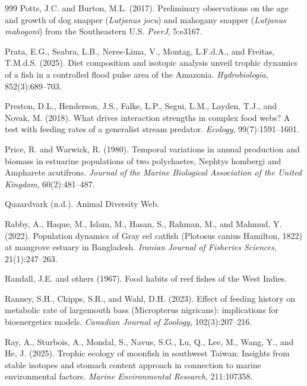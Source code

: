 \begin{thebibliography}{999}
Potts, J.C. and Burton, M.L. (2017). Preliminary observations on the age and growth of dog snapper (\textit{Lutjanus jocu}) and mahogany snapper (\textit{Lutjanus mahogoni}) from the Southeastern U.S. \textit{PeerJ}, 5:e3167.

Prata, E.G., Seabra, L.B., Neres-Lima, V., Montag, L.F.d.A., and Freitas, T.M.d.S. (2025). Diet composition and isotopic analysis unveil trophic dynamics of a fish in a controlled flood pulse area of the Amazonia. \textit{Hydrobiologia}, 852(3):689--703.

Preston, D.L., Henderson, J.S., Falke, L.P., Segui, L.M., Layden, T.J., and Novak, M. (2018). What drives interaction strengths in complex food webs? A test with feeding rates of a generalist stream predator. \textit{Ecology}, 99(7):1591--1601.

Price, R. and Warwick, R. (1980). Temporal variations in annual production and biomass in estuarine populations of two polychaetes, Nephtys hombergi and Ampharete acutifrons. \textit{Journal of the Marine Biological Association of the United Kingdom}, 60(2):481--487.

Quaardvark (n.d.). Animal Diversity Web.

Rabby, A., Haque, M., Islam, M., Hasan, S., Rahman, M., and Mahmud, Y. (2022). Population dynamics of Gray eel catfish (Plotosus canius Hamilton, 1822) at mangrove estuary in Bangladesh. \textit{Iranian Journal of Fisheries Sciences}, 21(1):247--263.

Randall, J.E. and others (1967). Food habits of reef fishes of the West Indies.

Ranney, S.H., Chipps, S.R., and Wahl, D.H. (2023). Effect of feeding history on metabolic rate of largemouth bass (Micropterus nigricans): implications for bioenergetics models. \textit{Canadian Journal of Zoology}, 102(3):207--216.

Ray, A., Sturbois, A., Mondal, S., Navus, S.G., Lu, Q., Lee, M., Wang, Y., and He, J. (2025). Trophic ecology of moonfish in southwest Taiwan: Insights from stable isotopes and stomach content approach in connection to marine environmental factors. \textit{Marine Environmental Research}, 211:107358.


\end{thebibliography}
